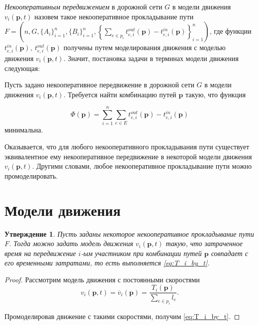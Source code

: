 \documentclass[12pt, a4paper]{article}
\newtheorem{state}{Утверждение}[section]
\begin{document}
\textit{Некооперативным передвижением} в дорожной сети $G$ в модели движения $v_i(\textbf{p}, t)$ назовем такое некооперативное прокладывание пути \\$F = \left(n, G, \{A_i\}_{i = 1}^{n}, \{B_i\}_{i = 1}^{n}, \left\{\sum\limits_{e \in p_i} t_{e, i}^{out}(\textbf{p}) - t_{e, i}^{in}(\textbf{p})\right\}_{i = 1}^{n}\right)$, где функции $t_{e, i}^{in}(\textbf{p}), \: t_{e, i}^{out}(\textbf{p})$ получены путем моделирования движения с моделью движения $v_i(\textbf{p}, t)$.
Значит, постановка задачи в терминах модели движения следующая:

Пусть задано некооперативное передвижение в дорожной сети $G$ в модели движения $v_i(\textbf{p}, t)$.
Требуется найти комбинацию путей $\textbf{p}$ такую, что функция 

\begin{equation}
\label{eq:target_task_end}
\Phi(\textbf{p}) =\sum \limits_{i = 1}^n \sum \limits_{e \in E} t_{e, i}^{out}(\textbf{p}) - t_{e, i}^{in}(\textbf{p})
\end{equation}
минимальна.

Оказывается, что для любого некооперативного прокладывания пути существует эквивалентное ему некооперативное передвижение в некоторой модели движения $v_i(\textbf{p}, t)$. Другими словами, любое некооперативное прокладывание пути можно промоделировать.

\newpage
\section{Модели движения}

\label{sec:models}

\begin{state}
	\label{state:eqv}
	Пусть заданы некоторое некооперативное прокладывание пути $F$. Тогда можно задать модель движения $v_i(\textbf{p}, t)$ такую, что затраченное время на передвижение $i$-ым участником при комбинации путей $\textbf{p}$ совпадает с его временными затратами, то есть выполняется \eqref{eq:T_i_by_t}.
	
\end{state}

\begin{proof}
Рассмотрим модель движения с постоянными скоростями  
$$v_i(\textbf{p}, t) = \overline{v}_i(\textbf{p}) = \frac{T_i (\textbf{p})}{\sum \limits_{e \in p_i} l_e}.$$

Промоделировав движение с такими скоростями, получим \eqref{eq:T_i_by_t}.
\end{proof}
\end{document}
